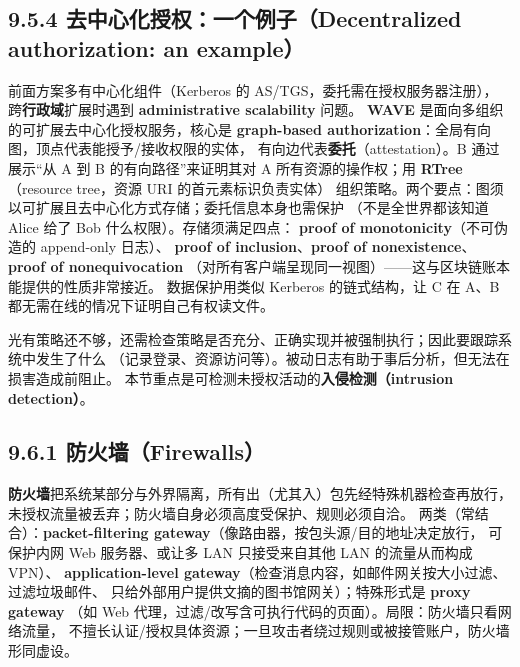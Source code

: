 \begin{closeread}
\end{closeread}


\subsection*{9.5.4 去中心化授权：一个例子（Decentralized authorization: an example）}
前面方案多有中心化组件（Kerberos 的 AS/TGS，委托需在授权服务器注册），
跨\textbf{行政域}扩展时遇到 \textbf{administrative scalability} 问题。
\textbf{WAVE} 是面向多组织的可扩展去中心化授权服务，核心是
\textbf{graph-based authorization}：全局有向图，顶点代表能授予/接收权限的实体，
有向边代表\textbf{委托}（attestation）。B 通过展示“从 A 到 B 的有向路径”来证明其对
A 所有资源的操作权；用 \textbf{RTree}（resource tree，资源 URI 的首元素标识负责实体）
组织策略。两个要点：图须以可扩展且去中心化方式存储；委托信息本身也需保护
（不是全世界都该知道 Alice 给了 Bob 什么权限）。存储须满足四点：
\textbf{proof of monotonicity}（不可伪造的 append-only 日志）、
\textbf{proof of inclusion}、\textbf{proof of nonexistence}、\textbf{proof of nonequivocation}
（对所有客户端呈现同一视图）——这与区块链账本能提供的性质非常接近。
数据保护用类似 Kerberos 的链式结构，让 C 在 A、B 都无需在线的情况下证明自己有权读文件。

\begin{closeread}
\end{closeread}



光有策略还不够，还需检查策略是否充分、正确实现并被强制执行；因此要跟踪系统中发生了什么
（记录登录、资源访问等）。被动日志有助于事后分析，但无法在损害造成前阻止。
本节重点是可检测未授权活动的\textbf{入侵检测（intrusion detection）}。

\subsection*{9.6.1 防火墙（Firewalls）}
\textbf{防火墙}把系统某部分与外界隔离，所有出（尤其入）包先经特殊机器检查再放行，
未授权流量被丢弃；防火墙自身必须高度受保护、规则必须自洽。
两类（常结合）：\textbf{packet-filtering gateway}（像路由器，按包头源/目的地址决定放行，
可保护内网 Web 服务器、或让多 LAN 只接受来自其他 LAN 的流量从而构成 VPN）、
\textbf{application-level gateway}（检查消息内容，如邮件网关按大小过滤、过滤垃圾邮件、
只给外部用户提供文摘的图书馆网关）；特殊形式是 \textbf{proxy gateway}
（如 Web 代理，过滤/改写含可执行代码的页面）。局限：防火墙只看网络流量，
不擅长认证/授权具体资源；一旦攻击者绕过规则或被接管账户，防火墙形同虚设。

